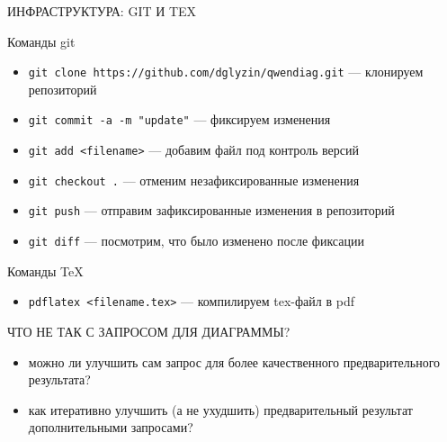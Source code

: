 \documentclass[aspectratio=169]{beamer}
\begin{document}
    \begin{frame}{ИНФРАСТРУКТУРА: GIT И TEX}
    	
    	{Команды git}
    	\begin{itemize}
    		\item [-] \texttt{git clone https://github.com/dglyzin/qwendiag.git} — клонируем репозиторий
    		\item [-] \texttt{git commit -a -m "update"} — фиксируем изменения
    		\item [-] \texttt{git add <filename>} — добавим файл под контроль версий
    		\item [-] \texttt{git checkout .} — отменим незафиксированные изменения
    		\item [-] \texttt{git push} — отправим зафиксированные изменения в репозиторий
    		\item [-] \texttt{git diff} — посмотрим, что было изменено после фиксации	
    	\end{itemize}
    
        {Команды TeX}
        \begin{itemize}
    	\item [-] \texttt{pdflatex <filename.tex>} — компилируем tex-файл в pdf
        \end{itemize}
    
    \end{frame}
    
    \begin{frame}{ЧТО НЕ ТАК С ЗАПРОСОМ ДЛЯ ДИАГРАММЫ?}
    \begin{itemize}
    	\item [-] можно ли улучшить сам запрос для более качественного предварительного результата?
    	\item [-] как итеративно улучшить (а не ухудшить) предварительный результат дополнительными запросами?
    \end{itemize}
    
    \end{frame}
\end{document}
